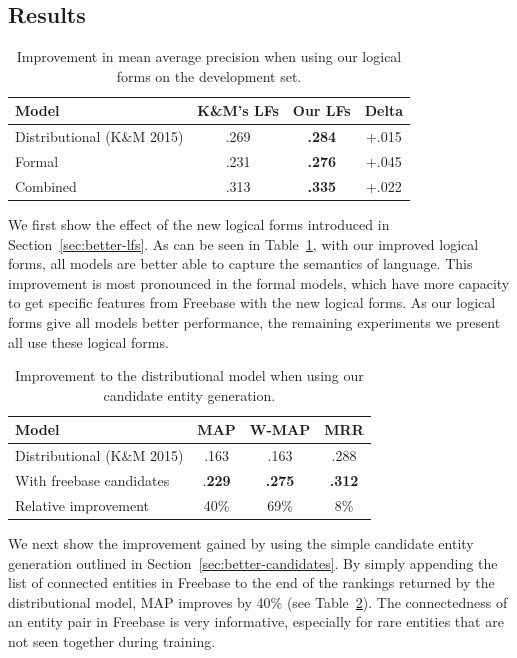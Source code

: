 \documentclass[11pt,letterpaper]{article}
\newcommand{\secref}[1]{Section~\ref{sec:#1}}
\newcommand{\tabref}[1]{Table~\ref{tab:#1}}
\begin{document}
\subsection{Results}

\begin{table}
  \centering
  {\small
    \begin{tabular}{l@{\hskip 0pt}ccc}
      \toprule
      Model & K\&M's LFs & Our LFs & Delta \\
      \midrule
      Distributional (K\&M 2015) & .269 & \textbf{.284} & +.015 \\
      Formal & .231 & \textbf{.276} & +.045 \\
      Combined & .313 & \textbf{.335} & +.022 \\
      \bottomrule
    \end{tabular}
  }
  \caption{Improvement in mean average precision when using our logical forms on the development
  set.}
  \label{tab:better-lfs}
\end{table}

We first show the effect of the new logical forms introduced in \secref{better-lfs}.  As can be
seen in \tabref{better-lfs}, with our improved logical forms, all models are better able to capture
the semantics of language.  This improvement is most pronounced in the formal models, which have
more capacity to get specific features from Freebase with the new logical forms.  As our logical
forms give all models better performance, the remaining experiments we present all use these
logical forms.

\begin{table}
  \centering
  {\small
    \begin{tabular}{lccc}
      \toprule
      Model & MAP & W-MAP & MRR \\
      \midrule
      Distributional (K\&M 2015) & .163 & .163 & .288 \\
      With freebase candidates & .\textbf{229} & \textbf{.275} & \textbf{.312} \\
      \midrule
      Relative improvement & 40\% & 69\% & 8\% \\
      \bottomrule
    \end{tabular}
  }
  \caption{Improvement to the distributional model when using our candidate entity generation.}
  \label{tab:better-candidates}
\end{table}

We next show the improvement gained by using the simple candidate entity generation outlined in
\secref{better-candidates}.  By simply appending the list of connected entities in Freebase to the
end of the rankings returned by the distributional model, MAP improves by 40\% (see
\tabref{better-candidates}).  The connectedness of an entity pair in Freebase is very informative,
especially for rare entities that are not seen together during training.
\end{document}

